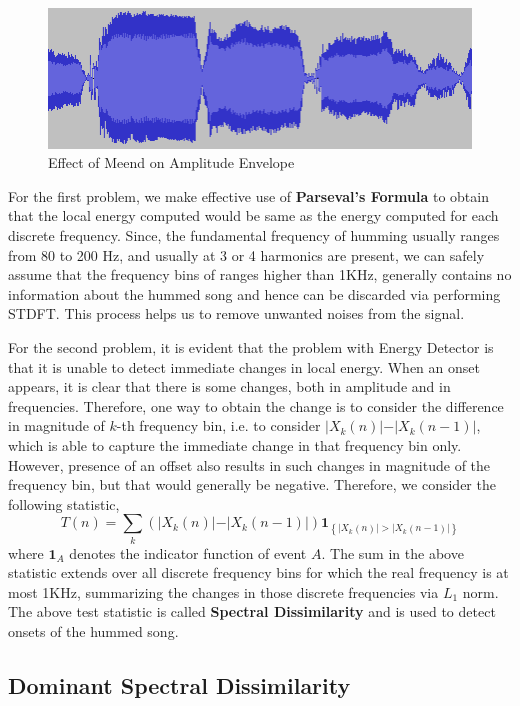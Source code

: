 \documentclass[10pt]{article}
\begin{document}
\begin{figure}
    \centering
    \includegraphics{onset_blob.png}
    \caption{Effect of Meend on Amplitude Envelope}
    \label{fig:onset_blob}
\end{figure}

For the first problem, we make effective use of \textbf{Parseval's Formula} to obtain that the local energy computed would be same as the energy computed for each discrete frequency. Since, the fundamental frequency of humming usually ranges from 80 to 200 Hz, and usually at 3 or 4 harmonics are present, we can safely assume that the frequency bins of ranges higher than 1KHz, generally contains no information about the hummed song and hence can be discarded via performing STDFT. This process helps us to remove unwanted noises from the signal.

For the second problem, it is evident that the problem with Energy Detector is that it is unable to detect immediate changes in local energy. When an onset appears, it is clear that there is some changes, both in amplitude and in frequencies. Therefore, one way to obtain the change is to consider the difference in magnitude of $k$-th frequency bin, i.e. to consider $\vert X_k(n) \vert - \vert X_k(n-1) \vert$, which is able to capture the immediate change in that frequency bin only. However, presence of an offset also results in such changes in magnitude of the frequency bin, but that would generally be negative. Therefore, we consider the following statistic,
$$T(n) = \sum_{k} \left(\vert X_k(n) \vert - \vert X_k(n-1) \vert\right) \textbf{1}_{\left\{\vert X_k(n) \vert > \vert X_k(n-1) \vert\right\}}$$
where $\textbf{1}_{A}$ denotes the indicator function of event $A$. The sum in the above statistic extends over all discrete frequency bins for which the real frequency is at most 1KHz, summarizing the changes in those discrete frequencies via $L_1$ norm.
The above test statistic is called \textbf{Spectral Dissimilarity} and is used to detect onsets of the hummed song.

\subsection{Dominant Spectral Dissimilarity}
\end{document}
